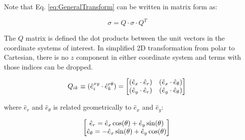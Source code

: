 Note that Eq. \ref{eq:GeneralTransform} can be written in matrix form as:

\[\sigma = Q \cdot \sigma \cdot Q^{T}\]

The $Q$ matrix is defined the dot products between the unit vectors in the coordinate systems of interest. In simplified 2D transformation from polar to Cartesian, there is no $z$ component in either coordinate system and terms with those indices can be dropped.


\begin{equation}
	Q_{ik} \equiv (\hat{e}_{i}^{xy} \cdot \hat{e}_k^{r \theta}) =
	\begin{bmatrix}
		(\hat{e}_{x} \cdot \hat{e}_{r}) & (\hat{e}_{x} \cdot \hat{e}_{\theta})\\
		(\hat{e}_{y} \cdot \hat{e}_{r}) & (\hat{e}_{y} \cdot \hat{e}_{\theta})\\
	\end{bmatrix}\\
\end{equation}

where $\hat{e}_{r}$ and $\hat{e}_{\theta}$ is related geometrically to $\hat{e}_{x}$ and $\hat{e}_{y}$:

\begin{equation}
	\begin{bmatrix}
		\hat{e}_{r} = \hat{e}_{x} \cos(\theta) + \hat{e}_{y} \sin(\theta)\\
		\hat{e}_{\theta} = -\hat{e}_{x} \sin(\theta) + \hat{e}_{y} \cos(\theta)\\
	\end{bmatrix}\\
\end{equation} 

